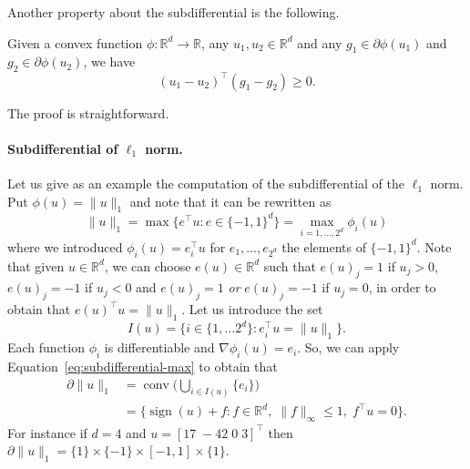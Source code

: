 \documentclass[
	fontsize=11pt, %
	twoside=false, %
	numbers=noenddot, %
]{kaobook}
\newcommand{\R}{\mathbb R}
\newcommand{\grad}{\nabla}
\newcommand{\norm}[1]{\| #1 \|}
\DeclareMathOperator{\conv}{conv}
\DeclareMathOperator{\sign}{sign}
\begin{document}
Another property about the subdifferential is the following.
\begin{proposition}
	Given a convex function $\phi : \R^d \rightarrow \R$, any $u_1, u_2 \in \R^d$ and any $g_1 \in \partial \phi(u_1)$ and $g_2 \in \partial \phi(u_2)$, we have
	\begin{equation*}
		(u_1 - u_2)^\top (g_1 - g_2) \geq 0.
	\end{equation*}
\end{proposition}
The proof is straightforward.%

\paragraph{Subdifferential of $\ell_1$ norm.} 

Let us give as an example the computation of the subdifferential of the $\ell_1$ norm.
Put $\phi(u) = \norm{u}_1$ and note that it can be rewritten as
\begin{equation*}
	\norm{u}_1 = \max \big\{ e^\top u : e \in \{ -1, 1 \}^d \big\} = \max_{i=1, \ldots, 2^d} \phi_i(u)
\end{equation*}
where we introduced $\phi_i(u) = e_i^\top u$ for $e_1, \ldots, e_{2^d}$ the elements of $\{ -1, 1 \}^d$.
Note that given $u \in \R^d$, we can choose $e(u) \in \R^d$ such that $e(u)_j = 1$ if $u_j > 0$, $e(u)_j = -1$ if $u_j < 0$ and $e(u)_j = 1$ \emph{or} $e(u)_j = -1$ if $u_j = 0$, in order to obtain that $e(u)^\top u = \norm{u}_1$.
Let us introduce the set
\begin{equation*}
	I(u) = \big\{ i \in \{ 1, \ldots 2^d \} : e_i^\top u = \norm{u}_1 \big\}.
\end{equation*}
Each function $\phi_i$ is differentiable and $\grad \phi_i(u) = e_i$. 
So, we can apply Equation~\eqref{eq:subdifferential-max} to obtain that
\begin{align*}
	\partial \norm{u}_1 &= \conv\Big( \bigcup_{i \in I(u)} \{ e_i \} \Big) \\
	&= \big\{ \sign(u) + f : f \in \R^d, \; \norm{f}_\infty \leq 1, \; f^\top u = 0 
	\big\}.
\end{align*}
For instance if $d = 4$ and $u = [17 \; -42 \; 0 \; 3]^\top$ then $\partial \norm{u}_1 = \{ 1 \} \times \{ -1 \} \times [-1, 1] \times \{ 1 \}$.
\end{document}
